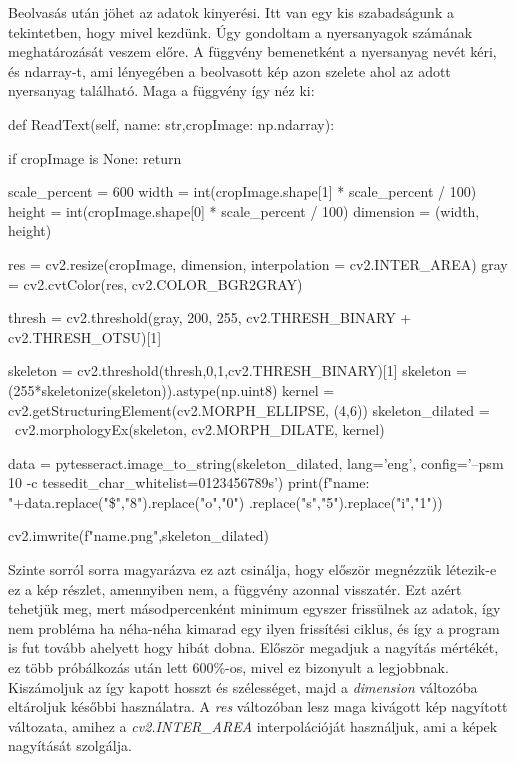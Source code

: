 Beolvasás után jöhet az adatok kinyerési. Itt van egy kis szabadságunk a tekintetben, hogy mivel kezdünk. Úgy gondoltam a nyersanyagok számának meghatározását veszem előre. A függvény bemenetként a nyersanyag nevét kéri, és ndarray-t, 
ami lényegében a beolvasott kép azon szelete ahol az adott nyersanyag található.
Maga a függvény így néz ki:
\begin{python}
def ReadText(self, name: str,cropImage: np.ndarray):

    if cropImage is None:
        return

    scale_percent = 600 
    width = int(cropImage.shape[1] * scale_percent / 100)
    height = int(cropImage.shape[0] * scale_percent / 100)
    dimension = (width, height)


    res = cv2.resize(cropImage, dimension, 
                    interpolation = cv2.INTER_AREA)
    gray = cv2.cvtColor(res, cv2.COLOR_BGR2GRAY)

    thresh = cv2.threshold(gray, 200, 255, 
                        cv2.THRESH_BINARY + cv2.THRESH_OTSU)[1]

    skeleton = cv2.threshold(thresh,0,1,cv2.THRESH_BINARY)[1]
    skeleton = (255*skeletonize(skeleton)).astype(np.uint8)
    kernel = cv2.getStructuringElement(cv2.MORPH_ELLIPSE, (4,6)) 
    skeleton_dilated = ~cv2.morphologyEx(skeleton, 
                            cv2.MORPH_DILATE, kernel)

    data = pytesseract.image_to_string(skeleton_dilated, 
    lang='eng', config='--psm 10 -c tessedit_char_whitelist=0123456789s')
    print(f"{name}: "+data.replace("\$","8").replace("o","0")
                    .replace("s","5").replace("i","1"))

    cv2.imwrite(f"{name}.png",skeleton_dilated)
\end{python}

Szinte sorról sorra magyarázva ez azt csinálja, hogy először megnézzük létezik-e ez a kép részlet, amennyiben nem, a függvény azonnal visszatér. Ezt azért tehetjük meg, mert másodpercenként minimum egyszer frissülnek az adatok, így nem probléma ha néha-néha kimarad egy ilyen frissítési ciklus, és így a program is fut tovább ahelyett hogy hibát dobna.
Először megadjuk a nagyítás mértékét, ez több próbálkozás után lett 600\%-os, mivel ez bizonyult a legjobbnak. Kiszámoljuk az így kapott hosszt és szélességet, majd a \textit{dimension} változóba eltároljuk későbbi használatra. 
A \textit{res} változóban lesz maga kivágott kép nagyított változata, amihez a \textit{cv2.INTER\_AREA} interpolációját használjuk, ami a képek nagyítását szolgálja.

